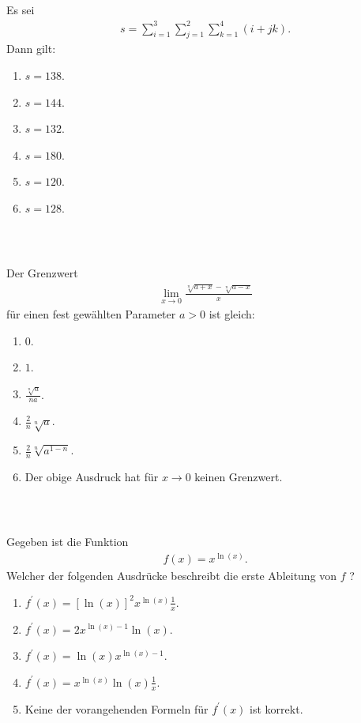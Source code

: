 \subsection*{}
Es sei
\begin{align*}
	s = \sum \limits_{i= 1}^3
	\sum \limits_{j= 1}^2
	\sum \limits_{k= 1}^4
	(i + jk).
\end{align*}
Dann gilt:
\renewcommand{\labelenumi}{(\alph{enumi})}
\begin{enumerate}
	\item 
	$ s= 138 $.
	\item
	$ s= 144 $.
	\item
	$ s= 132 $.
	\item
	$ s= 180 $.
	\item
	$ s= 120 $.
	\item
	$ s= 128 $.
\end{enumerate}
\ \\
\subsection*{}
Der Grenzwert
\begin{align*}
	\lim\limits_{x \to 0 }
	\frac{\sqrt[n]{a+x} - \sqrt[n]{a-x}}{x}
\end{align*}
für einen fest gewählten Parameter $ a > 0  $ ist gleich:
\renewcommand{\labelenumi}{(\alph{enumi})}
\begin{enumerate}
	\item 
	$0$.
	\item
	$1$.
	\item
	$\frac{\sqrt[n]{a}}{na}$.
	\item
	$\frac{2}{n} \sqrt[n]{a}$.
	\item
	$\frac{2}{n} \sqrt[n]{a^{1-n}}$.
	\item
	Der obige Ausdruck hat für $ x \to 0 $ keinen Grenzwert.	
\end{enumerate}
\ \\
\subsection*{}
Gegeben ist die Funktion
\begin{align*}
	f(x) = x^{\ln(x)}.
\end{align*}
Welcher der folgenden Ausdrücke beschreibt die erste Ableitung von $ f $ ?
\renewcommand{\labelenumi}{(\alph{enumi})}
\begin{enumerate}
\item 
$ f^\prime(x) = [\ln(x)]^2 x^{\ln(x)} \frac{1}{x}$.
\item
$ f^\prime(x) =2 x^{\ln(x) -1} \ln(x) $.
\item
$ f^\prime(x) = \ln(x) x^{\ln(x) -1} $.
\item
$ f^\prime(x) =  x^{\ln(x) }\ln(x)\frac{1}{x} $.
\item
Keine der vorangehenden Formeln für $ f^\prime(x)  $ ist korrekt.
\end{enumerate}
\ \\
